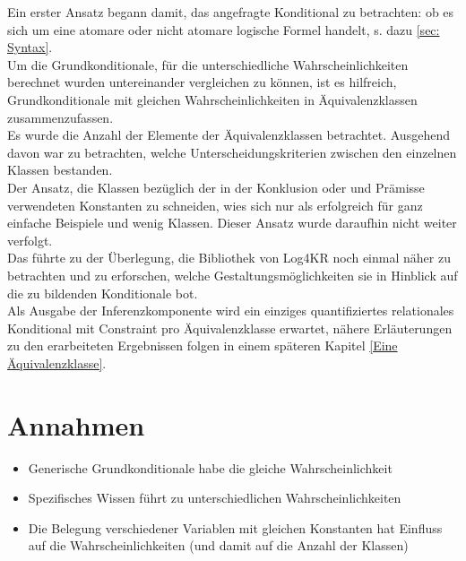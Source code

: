 \documentclass[draft]{scrreprt}
\begin{document}
Ein erster Ansatz begann damit, das angefragte Konditional zu betrachten: ob es sich um eine atomare oder nicht atomare logische Formel handelt, s. dazu \ref{sec: Syntax}.\\
Um die Grundkonditionale, für die unterschiedliche Wahrscheinlichkeiten berechnet wurden untereinander vergleichen zu können, ist es hilfreich, Grundkonditionale mit gleichen Wahrscheinlichkeiten in Äquivalenzklassen  zusammenzufassen.\\
Es wurde die Anzahl der Elemente der Äquivalenzklassen  betrachtet. Ausgehend davon war zu betrachten, welche Unterscheidungskriterien zwischen den einzelnen Klassen bestanden.\\
Der Ansatz, die Klassen bezüglich der in der Konklusion oder und Prämisse verwendeten Konstanten zu schneiden, wies sich nur als erfolgreich für ganz einfache Beispiele und wenig Klassen. Dieser Ansatz wurde daraufhin nicht weiter verfolgt.\\
Das führte zu der Überlegung, die Bibliothek von Log4KR noch einmal näher zu betrachten und zu erforschen, welche Gestaltungsmöglichkeiten sie in Hinblick auf die zu bildenden Konditionale bot.\\
Als Ausgabe der Inferenzkomponente wird ein einziges quantifiziertes relationales Konditional mit Constraint pro Äquivalenzklasse erwartet, nähere Erläuterungen zu den erarbeiteten Ergebnissen folgen in einem späteren Kapitel \ref{Eine Äquivalenzklasse}.


\section{Annahmen}

\begin{itemize}
	\item Generische Grundkonditionale habe die gleiche Wahrscheinlichkeit
	\item Spezifisches Wissen führt zu unterschiedlichen Wahrscheinlichkeiten
	\item Die Belegung verschiedener Variablen mit gleichen Konstanten hat Einfluss auf die Wahrscheinlichkeiten (und damit auf die Anzahl der Klassen)
	
\end{itemize}


\fontsize{11pt}{13.2pt}\selectfont

\setlongtables
\end{document}
